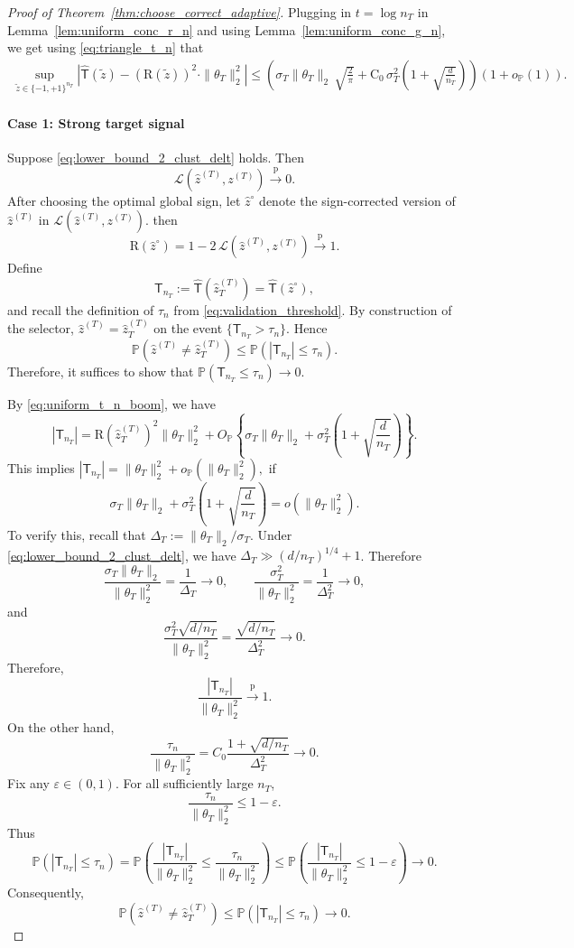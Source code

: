 \documentclass[10pt]{article}
\newcommand{\convp}{\xrightarrow{\mathrm{p}}}
\newcommand{\wh}{\widehat}
\newcommand{\wt}{\widetilde}
\newcommand{\trg}{T}
\newcommand{\thetaT}{\theta_{\trg}}
\newcommand{\nT}{n_{\trg}}
\newcommand{\sigmaT}{\sigma_{\trg}}
\newcommand{\ztar}{z^{(\trg)}}
\newcommand{\hatztar}{\wh{z}^{(\trg)}}
\newcommand{\DeltaT}{\Delta_{\trg}}
\newcommand{\rmT}{\mathsf{T}}
\begin{document}
\begin{proof}[Proof of Theorem~\ref{thm:choose_correct_adaptive}]
    Plugging in $t=\log\nT$ in Lemma~\ref{lem:uniform_conc_r_n} and using Lemma~\ref{lem:uniform_conc_g_n}, we get using \eqref{eq:triangle_t_n} that
    \begin{align}
    \label{eq:uniform_t_n_boom}
        \sup_{\wt z\in\{-1,+1\}^{\nT}}\left|\wh{\rmT}(\wt z)-(\mathrm R(\wt z))^2\cdot\|\thetaT\|^2_2\right| \le \left(\sigmaT\|\thetaT\|_2\,\sqrt{\frac{2}{\pi}}+\mathrm C_0\,\sigmaT^2\left(1+\sqrt{\frac{d}{\nT}}\right)\right)(1+o_{\mathbb P}(1)).
    \end{align}

\paragraph{Case 1: Strong target signal}
Suppose \eqref{eq:lower_bound_2_clust_delt} holds. Then
\[
\mathcal L(\hatztar,\ztar) \convp 0.
\]
After choosing the optimal global sign, let $\wh z^\circ$ denote the sign-corrected version of $\hatztar$ in $\mathcal L(\hatztar,\ztar)$. then
\[
\mathrm R(\wh z^\circ)=1-2\,\mathcal L(\hatztar,\ztar) \convp 1.
\]
Define
\[
    \rmT_{\nT}:=\wh{\rmT}(\hatztar_{\trg})=\wh{\rmT}(\wh z^\circ),
\]
and recall the definition of $\tau_n$ from \eqref{eq:validation_threshold}.
By construction of the selector, $\hatztar=\hatztar_{\trg}$ on the event $\{\rmT_{\nT}>\tau_{n}\}$. Hence
\[
\mathbb P(\hatztar\neq \hatztar_{\trg})\le \mathbb P(|\rmT_{\nT}|\le \tau_{n}).
\]
Therefore, it suffices to show that $\mathbb P(\rmT_{\nT}\le \tau_{n})\to0$.

By \eqref{eq:uniform_t_n_boom}, we have
\[
|\rmT_{\nT}|=\mathrm R(\hatztar_{\trg})^2\|\thetaT\|_2^2+ O_{\mathbb P}\left\{
\sigmaT\|\thetaT\|_2+\sigmaT^2\left(1+\sqrt{\frac{d}{\nT}}\right)\right\}.
\]
This implies $|\rmT_{\nT}|=\|\thetaT\|_2^2+o_{\mathbb P}(\|\thetaT\|_2^2),$
if
\[
\sigmaT\|\thetaT\|_2+\sigmaT^2\left(1+\sqrt{\frac{d}{\nT}}\right)=o(\|\thetaT\|_2^2).
\]
To verify this, recall that $\DeltaT:=\|\thetaT\|_2/\sigmaT$. Under \eqref{eq:lower_bound_2_clust_delt}, we have $\DeltaT\gg (d/\nT)^{1/4}+1$. Therefore
\[
\frac{\sigmaT\|\thetaT\|_2}{\|\thetaT\|_2^2}=\frac1{\DeltaT}\to0,\qquad
\frac{\sigmaT^2}{\|\thetaT\|_2^2}=\frac1{\DeltaT^2}\to0,
\]
and
\[
\frac{\sigmaT^2\sqrt{d/\nT}}{\|\thetaT\|_2^2}=\frac{\sqrt{d/\nT}}{\DeltaT^2}\to0.
\]
Therefore,
\[
\frac{|\rmT_{\nT}|}{\|\thetaT\|_2^2}\convp 1.
\]
On the other hand,
\[
\frac{\tau_{n}}{\|\thetaT\|_2^2}=C_0\frac{1+\sqrt{d/\nT}}{\DeltaT^2}\to0.
\]
Fix any $\varepsilon\in(0,1)$. For all sufficiently large $\nT$,
\[
\frac{\tau_{n}}{\|\thetaT\|_2^2}\le 1-\varepsilon.
\]
Thus
\[
\mathbb P(|\rmT_{\nT}|\le \tau_{n})
=\mathbb P\left(\frac{|\rmT_{\nT}|}{\|\thetaT\|_2^2}\le\frac{\tau_{n}}{\|\thetaT\|_2^2}\right) \le \mathbb P\left(\frac{|\rmT_{\nT}|}{\|\thetaT\|_2^2}\le1-\varepsilon\right)\to0.
\]
Consequently,
\[
\mathbb P(\hatztar\neq \hatztar_{\trg})\le \mathbb P(|\rmT_{\nT}|\le \tau_{n})\to0.
\]


\end{proof}
\end{document}
